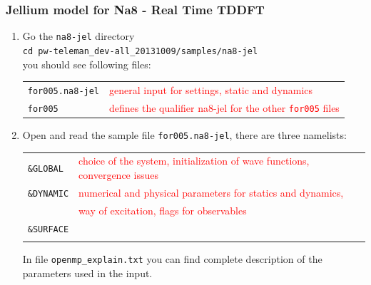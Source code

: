 \documentclass[10pt]{beamer}
\begin{document}
\begin{frame}
\frametitle{Jellium model for Na8 - Real Time TDDFT}
\begin{enumerate}
\item Go the {\tt na8-jel} directory\\
\vspace*{0.2cm}
{\tt cd pw-teleman\_dev-all\_20131009/samples/na8-jel}\\
\vspace*{0.2cm}
you should see following files:\\
\vspace*{0.2cm}
\begin{tabular}{ll}
{\tt for005.na8-jel} &{\scriptsize{\textcolor{red}{general input for settings, static and dynamics}}}\\
{\tt for005}  &{\scriptsize{\textcolor{red}{defines the qualifier na8-jel for the other {\tt for005} files}}}\\
\end{tabular}
\vspace*{0.4cm}


\item Open and read the sample file {\tt for005.na8-jel}, there are three namelists:\\
\vspace*{0.4cm}
\begin{tabular}{ll}
 {\tt \&GLOBAL} & {\scriptsize{\textcolor{red}{choice of the system, initialization of wave functions, convergence issues}}}\\
{\tt \&DYNAMIC}&{\scriptsize{\textcolor{red}{numerical and physical parameters for statics and dynamics, }}}\\
&{\scriptsize{\textcolor{red}{way of excitation, flags for observables}}}\\
 {\tt \&SURFACE}&\\
 \vspace*{0.2cm}
\end{tabular}
In file {\tt openmp\_explain.txt} you can find complete description of the parameters used in the input. 
\end{enumerate}
\end{frame}
\end{document}
